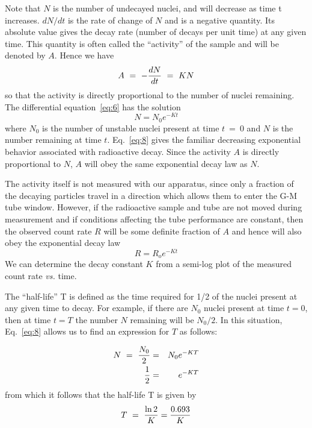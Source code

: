 Note that $N$ is the number of undecayed nuclei, and will decrease as time
t increases.  $dN/dt$ is the rate of change of $N$ and is a negative
quantity.  Its absolute value gives the decay rate (number of decays
per unit time) at any given time.  This quantity is often called the
``activity'' of the sample and will be denoted by $A$.  Hence we have
\begin{equation}
A ~=~ - { dN \over dt } ~=~ KN
\label{eq:7}
\end{equation}
so that the activity is directly proportional to the number of nuclei
remaining.  The differential equation~\ref{eq:6} has the solution
\begin{equation}
N = N_{0} e^{-Kt}
\label{eq:8}
\end{equation}
where $N_0$ is the number of unstable nuclei present at time $t~=~0$ and $N$ is
the number remaining at time $t$.  Eq.~\ref{eq:8} gives the familiar decreasing
exponential behavior associated with radioactive decay.  Since the
activity $A$ is directly proportional to $N$, $A$ will obey the same
exponential decay law as $N$.

The activity itself is not measured with our apparatus, since only a
fraction of the decaying particles travel in a direction which allows
them to enter the G-M tube window.  However, if the radioactive sample
and tube are not moved during measurement and if conditions affecting
the tube performance are constant, then the observed count rate $R$ will be some
definite fraction of $A$ and hence will also obey the exponential decay
law
\begin{equation}
R = R_{o} e^{-Kt}
\label{eq:9}
\end{equation}
We can determine the decay constant $K$ from a semi-log plot of the
measured count rate {\em vs.} time.

The ``half-life'' T is defined as the time
required for 1/2 of the nuclei present at any given time to decay.
For example, if there are $N_0$ nuclei present at time $t = 0$, then at
time $t = T$ the number $N$ remaining will be $N_0/2$.  In this situation,
Eq.~\ref{eq:8} allows us to find an expression for $T$ as follows:  

\begin{eqnarray}
N ~=~ {N_0 \over 2} &=& N_0 e^{-KT}\\
 {1 \over 2} &=& e^{-KT}
\end{eqnarray}
from which it follows that the half-life T is given by
\begin{equation}
T ~=~ {\ln{2} \over K} = {0.693 \over K}
\label{eq:11}
\end{equation}

